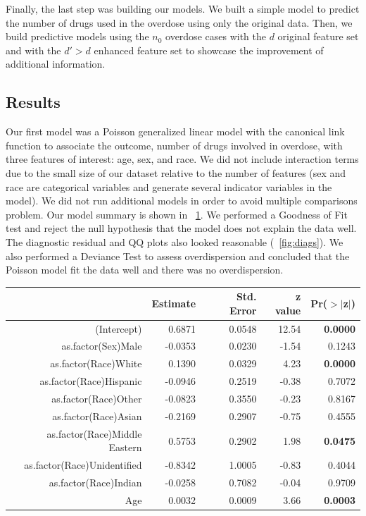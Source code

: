 \documentclass{article}
\begin{document}
Finally, the last step was building our models. We built a simple model to predict the number of drugs used in the overdose using only the original data. Then, we build predictive models using the $n_0$ overdose cases with the $d$ original feature set and with the $d' > d$ enhanced feature set to showcase the improvement of additional information.

\subsection{Results}

Our first model was a Poisson generalized linear model with the canonical link function to associate the outcome, number of drugs involved in overdose, with three features of interest: age, sex, and race. We did not include interaction terms due to the small size of our dataset relative to the number of features (sex and race are categorical variables and generate several indicator variables in the model). We did not run additional models in order to avoid multiple comparisons problem. Our model summary is shown in ~\ref{table:glmSum}. We performed a Goodness of Fit test and reject the null hypothesis that the model does not explain the data well. The diagnostic residual and QQ plots also looked reasonable (~\ref{fig:diags}). We also performed a Deviance Test to assess overdispersion and concluded that the Poisson model fit the data well and there was no overdispersion.

\begin{table}[ht]
\centering
\begin{tabular}{rrrrr}
  \hline
 & Estimate & Std. Error & z value & Pr($>$$|$z$|$) \\ 
  \hline
(Intercept) & 0.6871 & 0.0548 & 12.54 & {\bf 0.0000} \\ 
  as.factor(Sex)Male & -0.0353 & 0.0230 & -1.54 & 0.1243 \\ 
  as.factor(Race)White & 0.1390 & 0.0329 & 4.23 & {\bf 0.0000} \\ 
  as.factor(Race)Hispanic & -0.0946 & 0.2519 & -0.38 & 0.7072 \\ 
  as.factor(Race)Other & -0.0823 & 0.3550 & -0.23 & 0.8167 \\ 
  as.factor(Race)Asian & -0.2169 & 0.2907 & -0.75 & 0.4555 \\ 
  as.factor(Race)Middle Eastern & 0.5753 & 0.2902 & 1.98 & {\bf 0.0475} \\ 
  as.factor(Race)Unidentified & -0.8342 & 1.0005 & -0.83 & 0.4044 \\ 
  as.factor(Race)Indian & -0.0258 & 0.7082 & -0.04 & 0.9709 \\ 
  Age & 0.0032 & 0.0009 & 3.66 & {\bf 0.0003} \\ 
   \hline
\end{tabular}
\label{table:glmSum}
\end{table}
\end{document}
